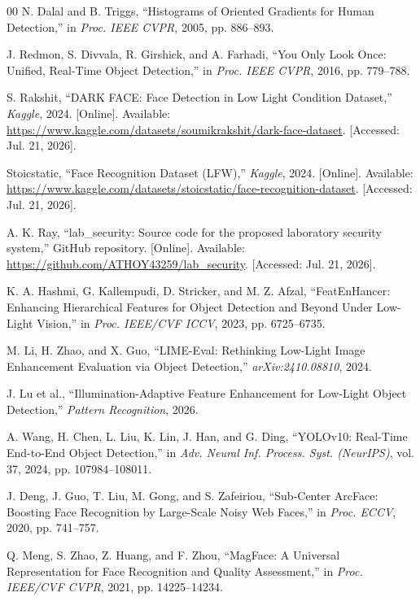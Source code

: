 \documentclass[conference]{IEEEtran}
\begin{document}
\begin{thebibliography}{00}
N. Dalal and B. Triggs, ``Histograms of Oriented Gradients for
Human Detection,'' in \textit{Proc. IEEE CVPR}, 2005, pp.
886--893.

J. Redmon, S. Divvala, R. Girshick, and A. Farhadi, ``You Only
Look Once: Unified, Real-Time Object Detection,'' in \textit{Proc.
IEEE CVPR}, 2016, pp. 779--788.

S. Rakshit, ``DARK FACE: Face Detection in Low Light Condition
Dataset,'' \textit{Kaggle}, 2024. [Online]. Available:
\url{https://www.kaggle.com/datasets/soumikrakshit/dark-face-dataset}.
[Accessed: Jul. 21, 2026].

Stoicstatic, ``Face Recognition Dataset (LFW),''
\textit{Kaggle}, 2024. [Online]. Available:
\url{https://www.kaggle.com/datasets/stoicstatic/face-recognition-dataset}.
[Accessed: Jul. 21, 2026].

A. K. Ray, ``lab\_security: Source code for the proposed laboratory security system,'' GitHub repository. [Online]. Available: \url{https://github.com/ATHOY43259/lab_security}. [Accessed: Jul. 21, 2026].

K. A. Hashmi, G. Kallempudi, D. Stricker, and M. Z. Afzal,
``FeatEnHancer: Enhancing Hierarchical Features for Object
Detection and Beyond Under Low-Light Vision,'' in \textit{Proc.
IEEE/CVF ICCV}, 2023, pp. 6725--6735.

M. Li, H. Zhao, and X. Guo, ``LIME-Eval: Rethinking Low-Light
Image Enhancement Evaluation via Object Detection,''
\textit{arXiv:2410.08810}, 2024.

J. Lu et al., ``Illumination-Adaptive Feature Enhancement for
Low-Light Object Detection,'' \textit{Pattern Recognition}, 2026.

A. Wang, H. Chen, L. Liu, K. Lin, J. Han, and G. Ding, ``YOLOv10:
Real-Time End-to-End Object Detection,'' in \textit{Adv. Neural
Inf. Process. Syst. (NeurIPS)}, vol. 37, 2024, pp. 107984--108011.

J. Deng, J. Guo, T. Liu, M. Gong, and S. Zafeiriou, ``Sub-Center
ArcFace: Boosting Face Recognition by Large-Scale Noisy Web
Faces,'' in \textit{Proc. ECCV}, 2020, pp. 741--757.

Q. Meng, S. Zhao, Z. Huang, and F. Zhou, ``MagFace: A Universal
Representation for Face Recognition and Quality Assessment,'' in
\textit{Proc. IEEE/CVF CVPR}, 2021, pp. 14225--14234.


\end{thebibliography}
\end{document}
